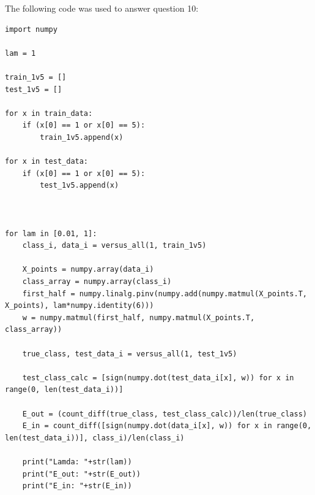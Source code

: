 \documentclass{article}
\begin{document}
\newpage
{\huge The following code was used to answer question 10:}
\begin{verbatim}
import numpy

lam = 1

train_1v5 = []
test_1v5 = []

for x in train_data:
    if (x[0] == 1 or x[0] == 5):
        train_1v5.append(x)
        
for x in test_data:
    if (x[0] == 1 or x[0] == 5):
        test_1v5.append(x)
        

                
for lam in [0.01, 1]:
    class_i, data_i = versus_all(1, train_1v5)
    
    X_points = numpy.array(data_i)
    class_array = numpy.array(class_i)
    first_half = numpy.linalg.pinv(numpy.add(numpy.matmul(X_points.T, X_points), lam*numpy.identity(6)))
    w = numpy.matmul(first_half, numpy.matmul(X_points.T, class_array))
    
    true_class, test_data_i = versus_all(1, test_1v5)
    
    test_class_calc = [sign(numpy.dot(test_data_i[x], w)) for x in range(0, len(test_data_i))]
    
    E_out = (count_diff(true_class, test_class_calc))/len(true_class)
    E_in = count_diff([sign(numpy.dot(data_i[x], w)) for x in range(0, len(test_data_i))], class_i)/len(class_i)
    
    print("Lamda: "+str(lam))
    print("E_out: "+str(E_out))
    print("E_in: "+str(E_in))
\end{verbatim}
\end{document}
